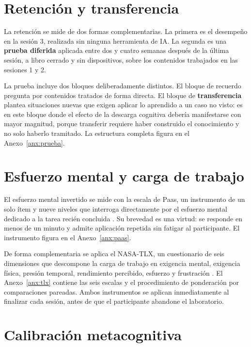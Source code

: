 \documentclass[12pt,a4paper,openany]{report}
\begin{document}
    \section{Retenci\'on y transferencia}
    
    La retenci\'on se mide de dos formas complementarias. La primera es el desempe\~no en la sesi\'on 3, realizada sin ninguna herramienta de IA. La segunda es una \textbf{prueba diferida} aplicada entre dos y cuatro semanas despu\'es de la \'ultima sesi\'on, a libro cerrado y sin dispositivos, sobre los contenidos trabajados en las sesiones 1 y 2.
    
    La prueba incluye dos bloques deliberadamente distintos. El bloque de recuerdo pregunta por contenidos tratados de forma directa. El bloque de \textbf{transferencia} plantea situaciones nuevas que exigen aplicar lo aprendido a un caso no visto: es en este bloque donde el efecto de la descarga cognitiva deber\'ia manifestarse con mayor magnitud, porque transferir requiere haber construido el conocimiento y no solo haberlo tramitado. La estructura completa figura en el Anexo~\ref{anx:prueba}.
    
    \section{Esfuerzo mental y carga de trabajo}
    
    El esfuerzo mental invertido se mide con la escala de Paas, un instrumento de un solo \'item y nueve niveles que interroga directamente por el esfuerzo mental dedicado a la tarea reci\'en concluida \citep{paas1992training}. Su brevedad es una virtud: se responde en menos de un minuto y admite aplicaci\'on repetida sin fatigar al participante. El instrumento figura en el Anexo~\ref{anx:paas}.
    
    De forma complementaria se aplica el NASA-TLX, un cuestionario de seis dimensiones que descompone la carga de trabajo en exigencia mental, exigencia f\'isica, presi\'on temporal, rendimiento percibido, esfuerzo y frustraci\'on \citep{hart1988development}. El Anexo~\ref{anx:tlx} contiene las seis escalas y el procedimiento de ponderaci\'on por comparaciones pareadas. Ambos instrumentos se aplican inmediatamente al finalizar cada sesi\'on, antes de que el participante abandone el laboratorio.
    
    \section{Calibraci\'on metacognitiva}
    \label{sec:calibracion}
    
\end{document}
